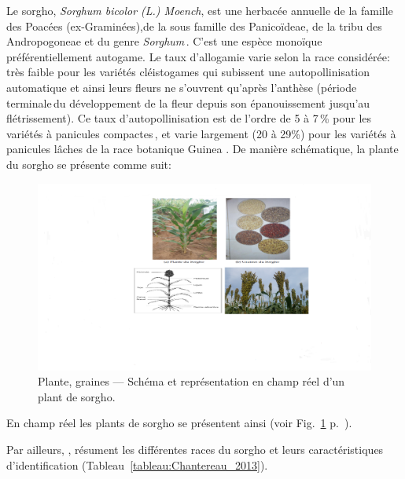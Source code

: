 \documentclass[a4paper,11pt]{article}
\begin{document}
Le sorgho, \emph{Sorghum bicolor (L.) Moench}, est une herbacée
annuelle de la famille des Poacées (ex-Graminées),de la sous famille
des Panicoïdeae, de la tribu des Andropogoneae et du genre
\emph{Sorghum}\,\cite{Doggett_1988}.  C’est une espèce monoïque
préférentiellement autogame. Le taux d’allogamie varie selon la race
considérée: très faible pour les variétés cléistogames qui subissent
une autopollinisation automatique et ainsi leurs fleurs ne s’ouvrent
qu’après l’anthèse (période terminale\,du développement de la fleur
depuis son épanouissement jusqu’au flétrissement). Ce taux
d'autopollinisation est de l’ordre de 5 à 7\,\% pour les variétés à
panicules compactes\,\cite{Doggett_1988}, et varie largement (20 à
29\%) pour les variétés à panicules lâches de la race botanique
Guinea \cite{Ollitrault_1987,Chantereau_1994}. De manière
schématique, la plante du sorgho se présente comme suit:


 
\begin{figure}%
  \begin{center}
    \includegraphics[width=16cm]{images/SchemaComposePage5}
  \end{center}
  \caption{Plante, graines --- Schéma et représentation en champ réel d'un plant de sorgho.}
   \label{fig-SchemaComposePage5}
\end{figure}

En champ réel les plants de sorgho se présentent ainsi (voir
Fig.~\ref{fig-SchemaComposePage5}
p.~\pageref{fig-SchemaComposePage5}).


Par ailleurs, , résument les différentes races du sorgho et
leurs caractéristiques d'identification (Tableau~\ref{tableau:Chantereau_2013}).
\end{document}
